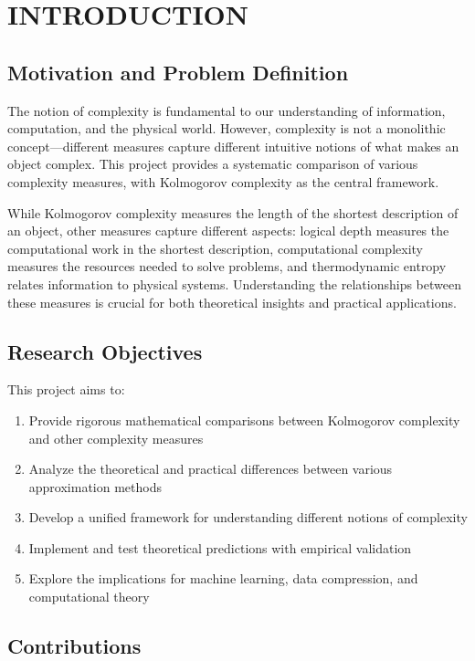 \documentclass[12pt,a4paper]{report}
\begin{document}
\setcounter{page}{1}

\chapter{INTRODUCTION}

\section{Motivation and Problem Definition}

The notion of complexity is fundamental to our understanding of information, computation, and the physical world. However, complexity is not a monolithic concept—different measures capture different intuitive notions of what makes an object complex. This project provides a systematic comparison of various complexity measures, with Kolmogorov complexity as the central framework.

While Kolmogorov complexity measures the length of the shortest description of an object, other measures capture different aspects: logical depth measures the computational work in the shortest description, computational complexity measures the resources needed to solve problems, and thermodynamic entropy relates information to physical systems. Understanding the relationships between these measures is crucial for both theoretical insights and practical applications.

\section{Research Objectives}

This project aims to:
\begin{enumerate}
    \item Provide rigorous mathematical comparisons between Kolmogorov complexity and other complexity measures
    \item Analyze the theoretical and practical differences between various approximation methods
    \item Develop a unified framework for understanding different notions of complexity
    \item Implement and test theoretical predictions with empirical validation
    \item Explore the implications for machine learning, data compression, and computational theory
\end{enumerate}

\section{Contributions}
\end{document}
